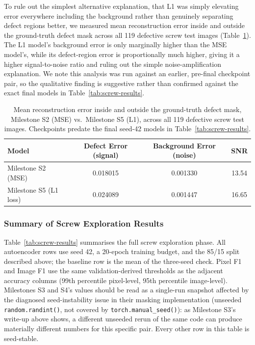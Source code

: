 To rule out the simplest alternative explanation, that L1 was simply
elevating error everywhere including the background rather than genuinely
separating defect regions better, we measured mean reconstruction error
inside and outside the ground-truth defect mask across all 119 defective
screw test images (Table~\ref{tab:screw-snr}). The L1 model's background
error is only marginally higher than the MSE model's, while its
defect-region error is proportionally much higher, giving it a higher
signal-to-noise ratio and ruling out the simple noise-amplification
explanation. We note this analysis was run against an earlier,
pre-final checkpoint pair, so the qualitative finding is suggestive rather
than confirmed against the exact final models in
Table~\ref{tab:screw-results}.

\begin{table}[h]
\centering
\caption{Mean reconstruction error inside and outside the ground-truth defect
mask, Milestone S2 (MSE) vs.\ Milestone S5 (L1), across all 119 defective
screw test images. Checkpoints predate the final seed-42 models in
Table~\ref{tab:screw-results}.}
\begin{tabular}{lccc}
\toprule
Model & Defect Error (signal) & Background Error (noise) & SNR \\
\midrule
Milestone S2 (MSE) & 0.018015 & 0.001330 & 13.54 \\
Milestone S5 (L1 loss) & 0.024089 & 0.001447 & 16.65 \\
\bottomrule
\end{tabular}
\label{tab:screw-snr}
\end{table}

\subsubsection{Summary of Screw Exploration Results}

Table~\ref{tab:screw-results} summarises the full screw exploration phase.
All autoencoder rows use seed 42, a 20-epoch training budget, and the 85/15
split described above; the baseline row is the mean of the three-seed check.
Pixel F1 and Image F1 use the same validation-derived thresholds as the
adjacent accuracy columns (99th percentile pixel-level, 95th percentile
image-level). Milestones S3 and S4's values should be read as a single-run
snapshot affected by the diagnosed seed-instability issue in their masking
implementation (unseeded \texttt{random.randint()}, not covered by
\texttt{torch.manual\_seed()}): as Milestone S3's write-up above shows, a
different unseeded rerun of the same code can produce materially different
numbers for this specific pair. Every other row in this table is seed-stable.


